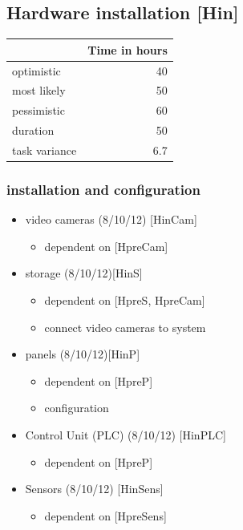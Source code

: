 \subsection*{Hardware installation [Hin]}
\label{sec:org2cae8f9}

\begin{center}
\begin{tabular}{|l|r|}
	\hline
	& Time in hours\\
	\hline
	optimistic & 40\\
	\hline
	most likely & 50\\
	\hline
	pessimistic & 60\\
	\hline
	\hline
	duration & 50\\
	\hline
	task variance & 6.7\\
	\hline
\end{tabular}
\end{center}

\subsubsection*{installation and configuration}
\label{sec:org7c12187}
\begin{itemize}
\item video cameras (8/10/12) [HinCam] 
	\begin{itemize}
	\item dependent on [HpreCam]
	\end{itemize}
\item storage  (8/10/12)[HinS]
	\begin{itemize}
	\item dependent on [HpreS, HpreCam]
	\item connect video cameras to system
	\end{itemize}
\item panels (8/10/12)[HinP]
	\begin{itemize}
	\item dependent on [HpreP]
	\item configuration
	\end{itemize}
\item Control Unit (PLC) (8/10/12) [HinPLC]
	\begin{itemize}
	\item dependent on [HpreP]
	\end{itemize}
\item Sensors (8/10/12) [HinSens]
	\begin{itemize}
	\item dependent on [HpreSens]
	\end{itemize}
\end{itemize}

